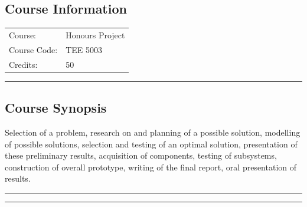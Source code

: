 
\subsection*{Course Information}
\vspace{0ex}%
\noindent\parbox{0.5\textwidth}{%
    \noindent\begin{tabular}{@{}ll}
                 \textsf{Course:}          & 	Honours Project \\
                 \textsf{Course Code:}         & 	TEE 5003 \\
                 \textsf{Credits:}    & 	50
    \end{tabular}}
\vspace{2ex}\hrule\vspace{2ex}


\subsection*{Course Synopsis}
Selection of a problem, research on and planning of a possible solution, modelling of possible solutions, selection and testing of an optimal solution, presentation of these preliminary results, acquisition of components, testing of subsystems, construction of overall prototype, writing of the final report, oral presentation of results.
\vspace{2ex}\hrule
\vspace{2ex}\hrule\vspace{2ex}